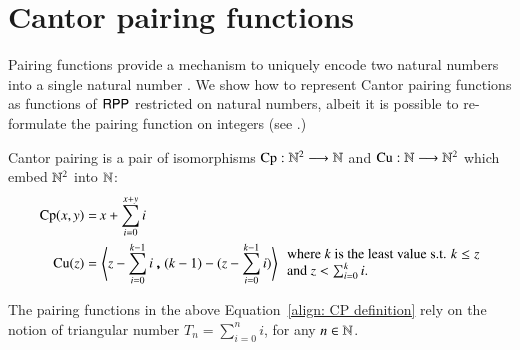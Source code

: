 \section{Cantor pairing functions}
\label{section:Cantor pairing}
Pairing functions provide a mechanism to uniquely encode two natural numbers into a 
single natural number \cite{rosenberg2009book}. 
We show how to represent Cantor pairing functions as functions of $\mathsf{RPP}$ 
restricted on natural numbers,
albeit it is possible to re-formulate the pairing function on integers (see \cite{PaoliniPiccoloRoversiICTCS2015}.)

\begin{definition}\label{grishpan}
Cantor pairing is a pair of isomorphisms $ \operatorname{Cp}: \mathbb{N}^2 \longrightarrow \mathbb{N} $ and 
$ \operatorname{Cu}: \mathbb{N} \longrightarrow \mathbb{N}^2 $ which embed $ \mathbb{N}^2 $ into $ \mathbb{N}$:
\begin{align}
\label{align: CP definition}
\CP(x,y) = \, & x + \sum_{i=0}^{x+y} i\\
\nonumber
\CU(z) =\, &  \left\langle z - \sum_{i=0}^{k - 1} i\;\pmb,\;(k - 1) 
                          - (z - \sum_{i=0}^{k - 1} i)
                          \right\rangle 
\ \  \begin{minipage}{.4\linewidth}
 where $k$  is the least value s.t. 
$k \leq z$ and  $z < \sum_{i=0}^{k} i$.
  \end{minipage}
\end{align}
\end{definition}

The pairing functions in the above Equation~\eqref{align: CP definition} rely on the notion of triangular number $T_n= \sum_{i=0}^{n} i$, for any $ n\in\mathbb{N} $.

